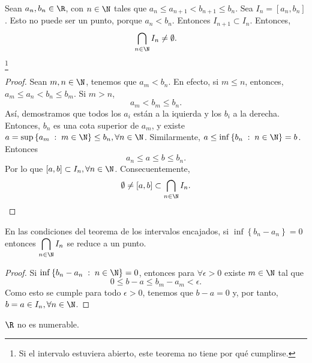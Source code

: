 \begin{ftheorem}
	\normalfont Sean $\displaystyle a_{n}, b_{n} \in \R $, con $\displaystyle n \in \N $ tales que $\displaystyle a_{n}\leq a_{n+1} < b_{n+1} \leq b_{n}$. Sea $\displaystyle I_{n} = \left[a_{n}, b_{n}\right]  $. Esto no puede ser un punto, porque $\displaystyle a_{n} < b_{n} $. Entonces $\displaystyle I_{n+1}\subset I_{n} $. Entonces, 
	\[\bigcap_{n \in \N} I_{n} \neq \emptyset .\]
\footnote{Si el intervalo estuviera abierto, este teorema no tiene por qué cumplirse.} 
\end{ftheorem}

\begin{proof}
Sean $\displaystyle m,n \in \N $, tenemos que $\displaystyle a_{m} < b_{n} $. En efecto, si $\displaystyle m \leq n $, entonces, $\displaystyle a_{m} \leq a_{n} < b_{n} \leq b_{m}$. Si $\displaystyle m > n $, 
\[a_{m} < b_{m} \leq b_{n}.\]
Así, demostramos que todos los $\displaystyle a_{i} $ están a la iquierda y los $\displaystyle b_{i} $ a la derecha. Entonces, $\displaystyle b_{n} $ es una cota superior de $\displaystyle a_{m} $, y existe $\displaystyle a = \sup \left\{ a_{m} \; : \; m \in \N\right\} \leq b_{n}, \forall n \in \N $. Similarmente, $\displaystyle a \leq \inf \left\{ b_{n} \; : \; n\in \N\right\} = b $. Entonces
\[a_{n}\leq a \leq b \leq b_{n} .\]
Por lo que $\displaystyle [a,b] \subset I_{n}, \forall n \in \N $. Consecuentemente, 
\[\emptyset \neq [a,b] \subset \bigcap_{n \in \N} I _{n} .\]
\end{proof}

\begin{fcolorary}[]
	\normalfont En las condiciones del teorema de los intervalos encajados, si $\displaystyle \inf \left\{ b_{n}-a_{n}\right\} =0 $ entonces $\displaystyle \bigcap_{n \in \N} I _{n} $ se reduce a un punto.
\end{fcolorary}

\begin{proof}
	Si $\displaystyle \inf \left\{ b_{n}-a_{n} \; : \; n \in \N\right\} = 0 $, entonces para $\displaystyle \forall \epsilon > 0 $ existe $\displaystyle m \in \N $ tal que 
	\[0 \leq b - a \leq b_{m}-a_{m} < \epsilon .\]
Como esto se cumple para todo $\displaystyle \epsilon > 0 $, tenemos que $\displaystyle b - a = 0 $ y, por tanto, $\displaystyle b = a \in I_{n}, \forall n \in \N$. 
\end{proof}

\begin{ftheorem}[]
\normalfont $\displaystyle \R $ no es numerable. 
\end{ftheorem}

